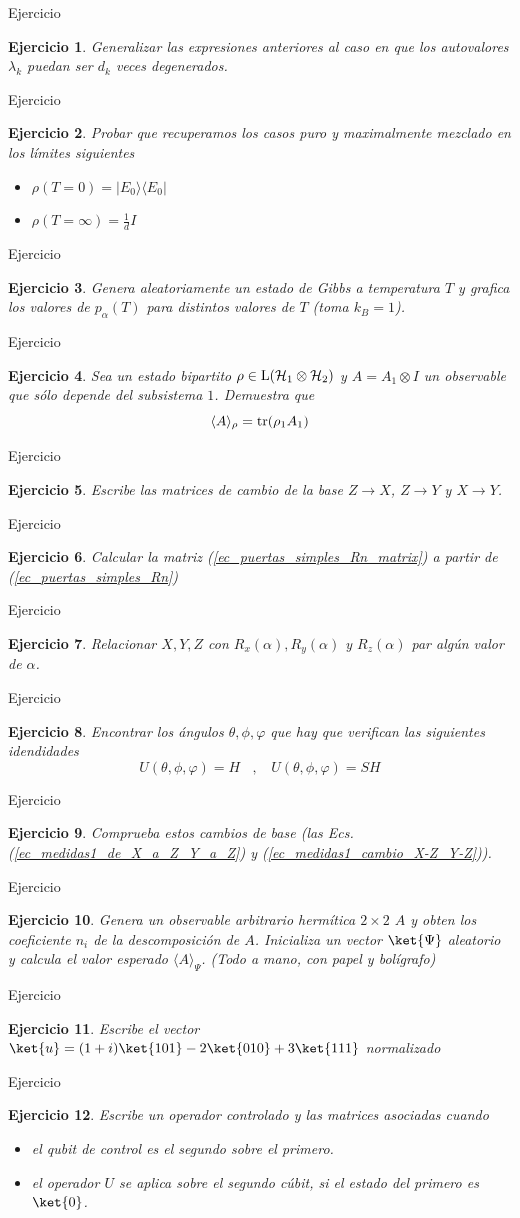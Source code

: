 \documentclass[a4paper,11pt]{book} %
\newtheorem{ejercicio_contador}{Ejercicio}
\newcommand{\Ejercicio}[1]{
		\begin{mybox_gray}{Ejercicio} 
			\begin{ejercicio_contador}
				 #1 
			\end{ejercicio_contador} 
		\end{mybox_gray}
	}
\numberwithin{equation}{chapter}
\newcommand{\ketbra}[2]{| #1\rangle \! \langle #2|}
\begin{document}
\Ejercicio{
Generalizar las expresiones anteriores al caso en que los autovalores $\lambda_k$ puedan ser $d_k$ veces degenerados.
}

\Ejercicio{
Probar  que recuperamos los casos puro y maximalmente mezclado en los límites siguientes
\begin{itemize}
\item $\rho(T=0) = \ketbra{E_0}{E_0}$
\item $\rho(T=\infty) = \frac{1}{d} I$
\end{itemize}
}

\Ejercicio{
Genera aleatoriamente un estado de Gibbs a temperatura $T$ y grafica los valores de $p_\alpha(T)$
para distintos valores de $T$ (toma $k_B=1$).
}

\Ejercicio{
Sea un estado bipartito $\rho \in {\rm L}(\mathcal{H}_1\otimes\mathcal{H}_2)$ y $A=A_1\otimes I$ un observable que sólo depende del subsistema $1$. Demuestra que
\begin{equation}
\langle A \rangle_\rho  = {\rm tr} (\rho_1 A_1)
\end{equation}
}

\Ejercicio{
Escribe las matrices de cambio de la base $Z\to X$, $Z\to Y$ y $X\to Y$.
}

\Ejercicio{
Calcular la matriz (\ref{ec_puertas_simples_Rn_matrix}) a partir de (\ref{ec_puertas_simples_Rn})
}

\Ejercicio{
Relacionar  $X,Y,Z$ con   $R_x(\alpha),R_y(\alpha)$ y $R_z(\alpha)$ par algún valor de $\alpha$.
}

\Ejercicio{
Encontrar los ángulos $\theta,\phi,\varphi$ que hay que verifican las siguientes idendidades
\begin{equation}
U(\theta,\phi,\varphi) = H ~~~~,~~~~  U(\theta,\phi,\varphi) = SH
\end{equation}
}

\Ejercicio{
Comprueba estos cambios de base (las Ecs. (\ref{ec_medidas1_de_X_a_Z_Y_a_Z}) y (\ref{ec_medidas1_cambio_X-Z_Y-Z})).
}

\Ejercicio{
Genera un observable arbitrario hermítica $2\times 2$ $A$ y obten los coeficiente $n_i$ de la descomposición de $A$.
Inicializa un vector $\ket{\Psi}$ aleatorio y calcula el valor esperado $\langle A \rangle_\Psi$. (Todo a mano, con papel y bolígrafo)
}

\Ejercicio{
Escribe el vector $\ket{u} = (1+i)\ket{101} -2\ket{010} + 3\ket{111}$ normalizado
}

\Ejercicio{
Escribe un operador controlado y las matrices asociadas cuando
\begin{itemize}
\item el qubit de control es el segundo sobre el primero.
\item el operador $U$ se aplica sobre el segundo cúbit, si el estado del primero es $\ket{0}$.
\end{itemize}
}
\end{document}
